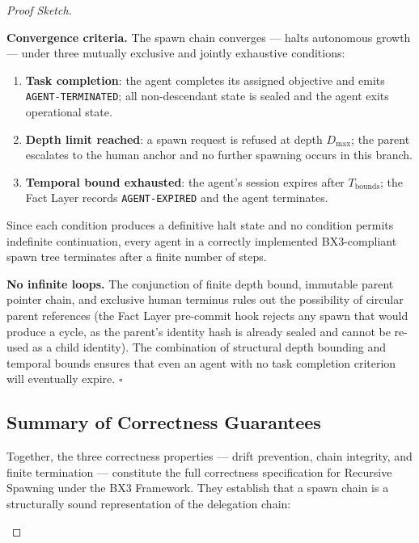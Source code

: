 \begin{proof}[Proof Sketch]
\begin{theorem}
\begin{Proof}
\bigskip
\noindent\textbf{Convergence criteria.} The spawn chain converges — halts autonomous growth — under three mutually exclusive and jointly exhaustive conditions:
\begin{enumerate}
  \item[(CC-1)] \textbf{Task completion}: the agent completes its assigned objective and emits \texttt{AGENT-TERMINATED}; all non-descendant state is sealed and the agent exits operational state.
  \item[(CC-2)] \textbf{Depth limit reached}: a spawn request is refused at depth $D_{\max}$; the parent escalates to the human anchor and no further spawning occurs in this branch.
  \item[(CC-3)] \textbf{Temporal bound exhausted}: the agent's session expires after $T_{\text{bounds}}$; the Fact Layer records \texttt{AGENT-EXPIRED} and the agent terminates.
\end{enumerate}

Since each condition produces a definitive halt state and no condition permits indefinite continuation, every agent in a correctly implemented BX3-compliant spawn tree terminates after a finite number of steps.

\bigskip
\noindent\textbf{No infinite loops.} The conjunction of finite depth bound, immutable parent pointer chain, and exclusive human terminus rules out the possibility of circular parent references (the Fact Layer pre-commit hook rejects any spawn that would produce a cycle, as the parent's identity hash is already sealed and cannot be re-used as a child identity). The combination of structural depth bounding and temporal bounds ensures that even an agent with no task completion criterion will eventually expire. $\square$
\end{Proof}

\subsection{Summary of Correctness Guarantees}

Together, the three correctness properties — drift prevention, chain integrity, and finite termination — constitute the full correctness specification for Recursive Spawning under the BX3 Framework. They establish that a spawn chain is a structurally sound representation of the delegation chain:


\end{theorem}
\end{proof}
